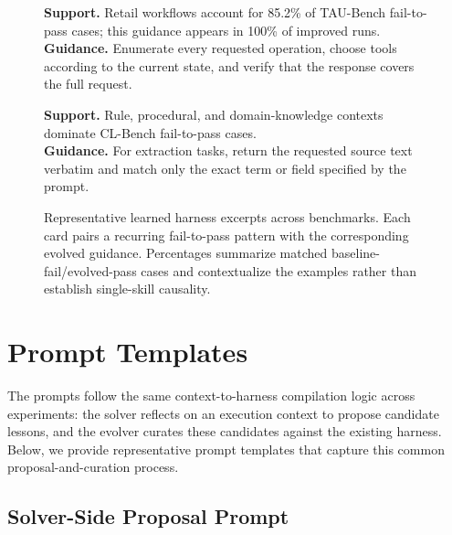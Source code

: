 \begin{figure}[t]
\vspace{4pt}
\begin{minipage}[t]{0.48\textwidth}
\begin{tcolorbox}[skillCard, colback=purple!2, colframe=purple!45,
title={TAU-Bench: complete tool execution}]
\small
\textbf{Support.} Retail workflows account for 85.2\% of TAU-Bench fail-to-pass cases; this guidance appears in 100\% of improved runs.\\
\textbf{Guidance.} Enumerate every requested operation, choose tools according to the current state, and verify that the response covers the full request.
\end{tcolorbox}
\end{minipage}
\hfill
\begin{minipage}[t]{0.48\textwidth}
\begin{tcolorbox}[skillCard, colback=gray!5, colframe=gray!45,
title={CL-Bench: constrained extraction}]
\small
\textbf{Support.} Rule, procedural, and domain-knowledge contexts dominate CL-Bench fail-to-pass cases.\\
\textbf{Guidance.} For extraction tasks, return the requested source text verbatim and match only the exact term or field specified by the prompt.
\end{tcolorbox}
\end{minipage}

\caption{
Representative learned harness excerpts across benchmarks. Each card pairs a recurring fail-to-pass pattern with the corresponding evolved guidance. Percentages summarize matched baseline-fail/evolved-pass cases and contextualize the examples rather than establish single-skill causality.
}
\label{fig:learned-skill-excerpts}
\end{figure}

\section{Prompt Templates}\label{app:prompts}

The prompts follow the same context-to-harness compilation logic across experiments: the solver reflects on an execution context to propose candidate lessons, and the evolver curates these candidates against the existing harness. Below, we provide representative prompt templates that capture this common proposal-and-curation process.

\subsection{Solver-Side Proposal Prompt}

